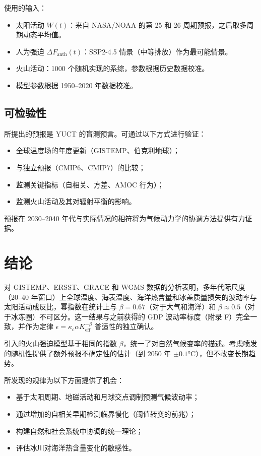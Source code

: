\documentclass[12pt,a4paper]{article}
\newcommand{\Keff}{K_{\mathrm{eff}}}
\newcommand{\kappac}{\kappa_c}
\newcommand{\be}{\beta}
\begin{document}
	使用的输入：
	\begin{itemize}
		\item 太阳活动 \(W(t)\)：来自 NASA/NOAA 的第 25 和 26 周期预报，之后取多周期动态平均值。
		\item 人为强迫 \(\Delta F_{\mathrm{anth}}(t)\)：SSP2-4.5 情景（中等排放）作为最可能情景。
		\item 火山活动：1000 个随机实现的系综，参数根据历史数据校准。
		\item 模型参数根据 1950–2020 年数据校准。
	\end{itemize}
	
	\subsection{可检验性}
	
	所提出的预报是 YUCT 的盲测预言。可通过以下方式进行验证：
	\begin{itemize}
		\item 全球温度场的年度更新（GISTEMP、伯克利地球）；
		\item 与独立预报（CMIP6、CMIP7）的比较；
		\item 监测关键指标（自相关、方差、AMOC 行为）；
		\item 监测火山活动及其对辐射平衡的影响。
	\end{itemize}
	预报在 2030–2040 年代与实际情况的相符将为气候动力学的协调方法提供有力证据。
	
	\section{结论}
	
	对 GISTEMP、ERSST、GRACE 和 WGMS 数据的分析表明，多年代际尺度（20–40 年窗口）上全球温度、海表温度、海洋热含量和冰盖质量损失的波动率与太阳活动成反比，幂指数在统计上与 \(\be = 0.67\)（对于大气和海洋）和 \(\be \approx 0.5\)（对于冰冻圈）不可区分。这一结果与之前获得的 GDP 波动率标度（附录 F）完全一致，并作为定律 \(\epsilon = \kappac \alpha \Keff^{-\be}\) 普适性的独立确认。
	
	引入的火山强迫模型基于相同的指数 \(\beta\)，统一了对自然气候变率的描述。考虑喷发的随机性提供了额外预报不确定性的估计（到 2050 年 \(\pm0.1\)°C），但不改变长期趋势。
	
	所发现的规律为以下方面提供了机会：
	\begin{itemize}
		\item 基于太阳周期、地磁活动和月球交点调制预测气候波动率；
		\item 通过增加的自相关早期检测临界慢化（阈值转变的前兆）；
		\item 构建自然和社会系统中协调的统一理论；
		\item 评估冰川对海洋热含量变化的敏感性。
	\end{itemize}
	
\end{document}
